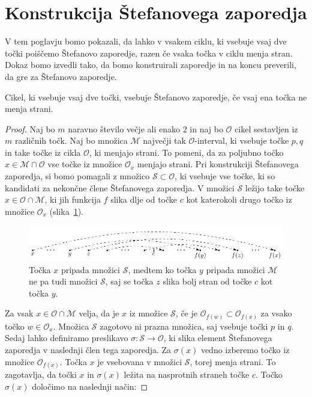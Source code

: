 \documentclass[mat2]{fmfdelo}
\begin{document}
\section{Konstrukcija Štefanovega zaporedja} \label{konssz}
V tem poglavju bomo pokazali, da lahko v vsakem ciklu, ki vsebuje vsaj dve točki poiščemo Štefanovo zaporedje, razen če vsaka točka v ciklu menja stran. Dokaz bomo izvedli tako, da bomo konstruirali zaporedje in na koncu preverili, da gre za Štefanovo zaporedje.
\begin{trditev}
Cikel, ki vsebuje vsaj dve točki, vsebuje Štefanovo zaporedje, če vsaj ena točka ne menja strani.
\end{trditev}
\begin{proof}
Naj bo $m$ naravno število večje ali enako $2$ in naj bo $\mathcal{O}$ cikel sestavljen iz $m$ različnih točk. Naj bo množica $\mathcal{M}$ največji tak $\mathcal{O}$-interval, ki vsebuje točke $p, q$ in take točke iz cikla $\mathcal{O}$, ki menjajo strani. To pomeni, da za poljubno točko $x \in \mathcal{M} \cap \mathcal{O}$ vse točke iz množice $\mathcal{O}_x$ menjajo strani. Pri konstrukciji Štefanovega zaporedja, si bomo pomagali z množico $\mathcal{S} \subset \mathcal{O}$, ki vsebuje vse točke, ki so kandidati za nekončne člene Štefanovega zaporedja. V množici $\mathcal{S}$ ležijo take točke $x \in \mathcal{O} \cap \mathcal{M}$, ki jih funkcija $f$ slika dlje od točke $c$ kot katerokoli drugo točko iz množice $\mathcal{O}_x$ (slika~\ref{fig:S}). 
\begin{figure}[h]
  \centering
  \includegraphics{images/mnozica_S.pdf}
  \caption[Konstrukcija množice S.]{Točka $x$ pripada množici $\mathcal{S}$, medtem ko točka $y$ pripada množici $\mathcal{M}$ ne pa tudi množici $\mathcal{S}$, saj se točka $z$ slika bolj stran od točke $c$ kot točka $y$.}
  \label{fig:S}
\end{figure}
Za vsak $x \in \mathcal{O} \cap \mathcal{M}$ velja, da je $x$ iz množice $\mathcal{S}$, če je $\mathcal{O}_{f(w)} \subset \mathcal{O}_{f(x)}$ za vsako točko $w \in \mathcal{O}_x$. Množica $\mathcal{S}$ zagotovo ni prazna množica, saj vsebuje točki $p$ in $q$. Sedaj lahko definiramo preslikavo $\sigma : \mathcal{S} \to \mathcal{O}$, ki slika element Štefanovega zaporedja v naslednji člen tega zaporedja. Za $\sigma(x)$ vedno izberemo točko iz množice $\mathcal{O}_{f(x)}$. Točka $x$ je vsebovana v množici $\mathcal{S}$, torej menja strani. To zagotavlja, da točki $x$ in $\sigma(x)$ ležita na nasprotnih straneh točke $c$. Točko $\sigma(x)$ določimo na naslednji način:

\end{proof}
\end{document}
